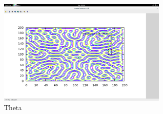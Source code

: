 \begin{figure}[tbh]
\begin{center}
\includegraphics[width=0.75\textwidth]{Theta.png}
\end{center}
\caption{Theta\label{fig:gprun}}
\end{figure}